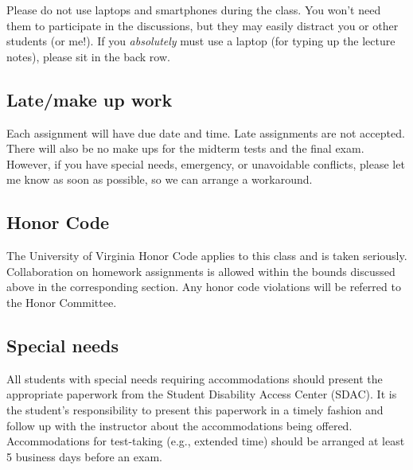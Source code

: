\documentclass[oneside,11pt]{amsart}
\begin{document}
Please do not use laptops and smartphones during the class.
You won't need them to participate in the discussions, but they may easily distract
you or other students (or me!). If you \emph{absolutely} must use a laptop
(for typing up the lecture notes), please sit in the back row.

\subsection{Late/make up work} Each assignment will have due date and time.
Late assignments are not accepted. There will also be no make ups for the midterm tests and the final exam.
However, if you have special needs, emergency, or unavoidable conflicts, please
let me know as soon as possible, so we can arrange a workaround.

\subsection{Honor Code} The University of Virginia Honor Code applies to this
class and is taken seriously. Collaboration on homework
assignments is allowed within the bounds discussed above
in the corresponding section.
Any honor code violations will be referred to the
Honor Committee.

\subsection{Special needs}

All students with special needs requiring accommodations should present the
appropriate paperwork from the Student Disability Access Center (SDAC). It is
the student's responsibility to present this paperwork in a timely fashion and
follow up with the instructor about the accommodations being offered.
Accommodations for test-taking (e.g., extended time) should be arranged at
least 5 business days before an exam.
\end{document}
